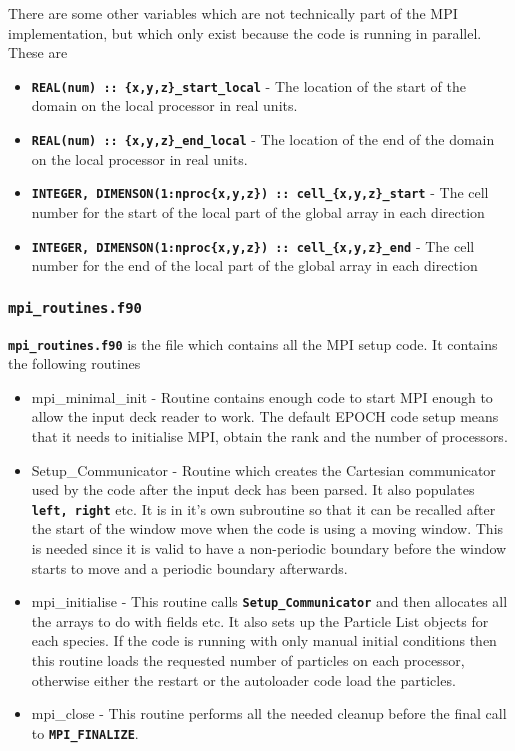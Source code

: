 \documentclass[12pt]{article}
\newcommand{\inlinecode}[1]{{\color{warwickred} \bf\texttt{#1}}}
\newcommand{\nEPOCH}{{\color{warwickdark}\fontfamily{phv}\selectfont EPOCH}}
\newcommand{\EPOCH}{{\nEPOCH} }
\begin{document}
There are some other variables which are not technically part of the MPI
implementation, but which only exist because the code is running in
parallel. These are
\begin{itemize}
\item \inlinecode{REAL(num) :: \{x,y,z\}\_start\_local} - The location of the
  start of the domain on the local processor in real units.
\item \inlinecode{REAL(num) :: \{x,y,z\}\_end\_local} - The location of the end
  of the domain on the local processor in real units.
\item \inlinecode{INTEGER, DIMENSON(1:nproc\{x,y,z\}) ::
    cell\_\{x,y,z\}\_start} - The cell number for the start of the local part
  of the global array in each direction
\item \inlinecode{INTEGER, DIMENSON(1:nproc\{x,y,z\}) :: cell\_\{x,y,z\}\_end}
  - The cell number for the end of the local part of the global array in each
  direction
\end{itemize}

\subsubsection{\inlinecode{mpi\_routines.f90}}
\inlinecode{mpi\_routines.f90} is the file which contains all the MPI setup
code. It contains the following routines
\begin{itemize}
\item mpi\_minimal\_init - Routine contains enough code to start MPI enough to
  allow the input deck reader to work. The default \EPOCH code setup means that
  it needs to initialise MPI, obtain the rank and the number of processors.
\item Setup\_Communicator - Routine which creates the Cartesian communicator
  used by the code after the input deck has been parsed. It also populates
  \inlinecode{left, right} etc. It is in it's own subroutine so that it can be
  recalled after the start of the window move when the code is using a moving
  window. This is needed since it is valid to have a non-periodic boundary
  before the window starts to move and a periodic boundary afterwards.
\item mpi\_initialise - This routine calls \inlinecode{Setup\_Communicator} and
  then allocates all the arrays to do with fields etc. It also sets up the
  Particle List objects for each species. If the code is running with only
  manual initial conditions then this routine loads the requested number of
  particles on each processor, otherwise either the restart or the autoloader
  code load the particles.
\item mpi\_close - This routine performs all the needed cleanup before the
  final call to \inlinecode{MPI\_FINALIZE}.
\end{itemize}
\end{document}
